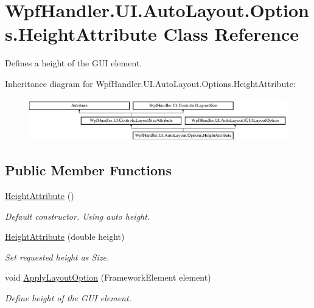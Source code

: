 \hypertarget{class_wpf_handler_1_1_u_i_1_1_auto_layout_1_1_options_1_1_height_attribute}{}\section{Wpf\+Handler.\+U\+I.\+Auto\+Layout.\+Options.\+Height\+Attribute Class Reference}
\label{class_wpf_handler_1_1_u_i_1_1_auto_layout_1_1_options_1_1_height_attribute}


Defines a height of the G\+UI element.  


Inheritance diagram for Wpf\+Handler.\+U\+I.\+Auto\+Layout.\+Options.\+Height\+Attribute\+:\begin{figure}[H]
\begin{center}
\leavevmode
\includegraphics[height=1.842105cm]{d8/d4b/class_wpf_handler_1_1_u_i_1_1_auto_layout_1_1_options_1_1_height_attribute}
\end{center}
\end{figure}
\subsection*{Public Member Functions}
\begin{DoxyCompactItemize}
\item 
\mbox{\hyperlink{class_wpf_handler_1_1_u_i_1_1_auto_layout_1_1_options_1_1_height_attribute_a95fb727e17f5d821370948bfc7ee33a3}{Height\+Attribute}} ()
\begin{DoxyCompactList}\small\item\em Default constructor. Using auto height. \end{DoxyCompactList}\item 
\mbox{\hyperlink{class_wpf_handler_1_1_u_i_1_1_auto_layout_1_1_options_1_1_height_attribute_a96c546720b620ae0b867c25992bad3d6}{Height\+Attribute}} (double height)
\begin{DoxyCompactList}\small\item\em Set requested height as Size. \end{DoxyCompactList}\item 
void \mbox{\hyperlink{class_wpf_handler_1_1_u_i_1_1_auto_layout_1_1_options_1_1_height_attribute_a221d69c339ceb5cd3e16d8e59f216cc9}{Apply\+Layout\+Option}} (Framework\+Element element)
\begin{DoxyCompactList}\small\item\em Define height of the G\+UI element. \end{DoxyCompactList}\end{DoxyCompactItemize}
